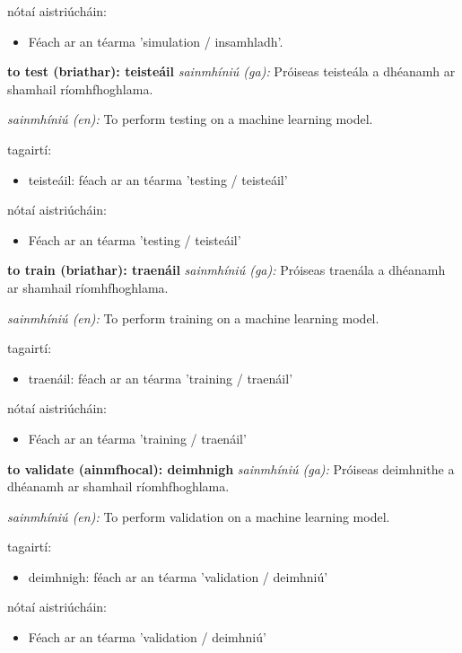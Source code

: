 \documentclass{article}
\begin{document}
nótaí aistriúcháin:
\begin{itemize}
	\item Féach ar an téarma 'simulation / insamhladh'.
\end{itemize}


\textbf{to test (briathar): teisteáil}
\textit{sainmhíniú (ga):} Próiseas teisteála a dhéanamh ar shamhail ríomhfhoghlama.

\textit{sainmhíniú (en):} To perform testing on a machine learning model.

tagairtí:
\begin{itemize}
	\item teisteáil: féach ar an téarma 'testing / teisteáil'
\end{itemize}

nótaí aistriúcháin:
\begin{itemize}
	\item Féach ar an téarma 'testing / teisteáil'
\end{itemize}


\textbf{to train (briathar): traenáil}
\textit{sainmhíniú (ga):} Próiseas traenála a dhéanamh ar shamhail ríomhfhoghlama.

\textit{sainmhíniú (en):} To perform training on a machine learning model.

tagairtí:
\begin{itemize}
	\item traenáil: féach ar an téarma 'training / traenáil'
\end{itemize}

nótaí aistriúcháin:
\begin{itemize}
	\item Féach ar an téarma 'training / traenáil'
\end{itemize}


\textbf{to validate (ainmfhocal): deimhnigh}
\textit{sainmhíniú (ga):} Próiseas deimhnithe a dhéanamh ar shamhail ríomhfhoghlama.

\textit{sainmhíniú (en):} To perform validation on a machine learning model.

tagairtí:
\begin{itemize}
	\item deimhnigh: féach ar an téarma 'validation / deimhniú'
\end{itemize}

nótaí aistriúcháin:
\begin{itemize}
	\item Féach ar an téarma 'validation / deimhniú'
\end{itemize}
\end{document}
